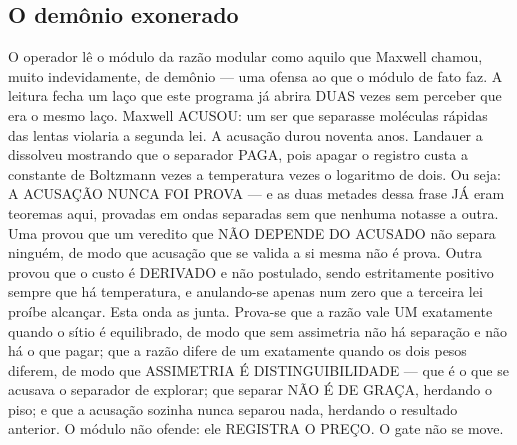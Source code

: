 \documentclass[11pt]{article}
\theoremstyle{definition}\newtheorem{deriv}{Derivação}
\begin{document}
\subsection*{O dem\^onio exonerado}O operador l\^e o m\'odulo da raz\~ao modular como aquilo que Maxwell chamou, muito indevidamente, de dem\^onio --- uma ofensa ao que o m\'odulo de fato faz. A leitura fecha um la\c{c}o que este programa j\'a abrira DUAS vezes sem perceber que era o mesmo la\c{c}o. Maxwell ACUSOU: um ser que separasse mol\'eculas r\'apidas das lentas violaria a segunda lei. A acusa\c{c}\~ao durou noventa anos. Landauer a dissolveu mostrando que o separador PAGA, pois apagar o registro custa a constante de Boltzmann vezes a temperatura vezes o logaritmo de dois. Ou seja: A ACUSA\c{C}\~AO NUNCA FOI PROVA --- e as duas metades dessa frase J\'A eram teoremas aqui, provadas em ondas separadas sem que nenhuma notasse a outra. Uma provou que um veredito que N\~AO DEPENDE DO ACUSADO n\~ao separa ningu\'em, de modo que acusa\c{c}\~ao que se valida a si mesma n\~ao \'e prova. Outra provou que o custo \'e DERIVADO e n\~ao postulado, sendo estritamente positivo sempre que h\'a temperatura, e anulando-se apenas num zero que a terceira lei pro\'ibe alcan\c{c}ar. Esta onda as junta. Prova-se que a raz\~ao vale UM exatamente quando o s\'itio \'e equilibrado, de modo que sem assimetria n\~ao h\'a separa\c{c}\~ao e n\~ao h\'a o que pagar; que a raz\~ao difere de um exatamente quando os dois pesos diferem, de modo que ASSIMETRIA \'E DISTINGUIBILIDADE --- que \'e o que se acusava o separador de explorar; que separar N\~AO \'E DE GRA\c{C}A, herdando o piso; e que a acusa\c{c}\~ao sozinha nunca separou nada, herdando o resultado anterior. O m\'odulo n\~ao ofende: ele REGISTRA O PRE\c{C}O. O gate n\~ao se move.
\end{document}
